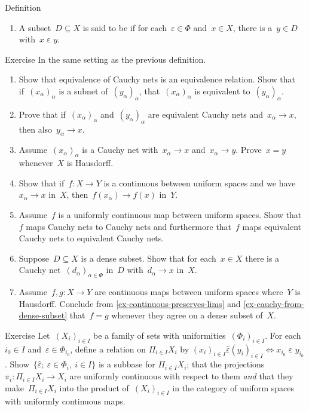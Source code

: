 \documentclass[b]{subfiles}
\begin{document}
\begin{parsec}
\begin{point}{Definition}
\begin{enumerate}
\item
A subset~$D \subseteq X$ is said to be 
    if for each~$\varepsilon \in \Phi$ and~$x \in X$,
    there is a~$y \in D$
    with~$x \mathrel\varepsilon y$.
\end{enumerate}
\end{point}
\begin{point}{Exercise}%
    In the same setting as the previous definition.
    \begin{enumerate}
\item
    Show that equivalence of Cauchy nets is an equivalence relation.
    Show that if~$(x_\alpha)_\alpha$ is a subnet of~$(y_\alpha)_\alpha$,
        that~$(x_\alpha)_\alpha$ is equivalent to~$(y_\alpha)_\alpha$.
\item
    Prove that if~$(x_\alpha)_\alpha$ and~$(y_\alpha)_\alpha$
        are equivalent Cauchy nets and~$x_\alpha \to x$,
        then also~$y_\alpha \to x$.
\item
    Assume~$(x_\alpha)_\alpha$ is a Cauchy net with~$x_\alpha \to x$
        and~$x_\alpha \to y$.  Prove~$x = y$ whenever~$X$ is Hausdorff.
\item\label{ex-continuous-preserves-lims}
    Show that if~$f\colon X \to Y$ is a continuous
    between uniform spaces
        and we have~$x_\alpha \to x$ in~$X$,
        then~$f(x_\alpha) \to f(x)$ in~$Y$.
\item
    Assume~$f$ is a uniformly continuous map between uniform spaces.
    Show that $f$ maps Cauchy nets to Cauchy nets
    and furthermore that~$f$ maps equivalent Cauchy nets to equivalent
        Cauchy nets.
\item\label{ex-cauchy-from-dense-subset}
    Suppose~$D \subseteq X$ is a dense subset.
    Show that for each~$x \in X$
    there is a Cauchy net~$(d_\alpha)_{\alpha \in \Phi}$
    in~$D$ with~$d_\alpha \to x$ in~$X$.
\item
    Assume~$f,g\colon X \to Y$ are continuous maps between uniform spaces
        where~$Y$ is Hausdorff.
Conclude from \ref{ex-continuous-preserves-lims} and
    \ref{ex-cauchy-from-dense-subset}
    that~$f=g$ whenever they agree on a dense subset of~$X$.
    \end{enumerate}
\end{point}
\begin{point}{Exercise}%
    Let~$(X_i)_{i \in I}$ be a family of sets with
        uniformities~$(\Phi_i)_{i \in I}$.
    For each~$i_0 \in I$
    and~$\varepsilon \in \Phi_{i_0}$,
    define a relation on
    $\Pi_{i \in I} X_i$ by
    $(x_i)_{i \in I} \mathrel{\hat\varepsilon} (y_i)_{i \in I}
    \iff x_{i_0} \mathrel\varepsilon y_{i_0}$.
    Show~$\{ \hat\varepsilon;\ \varepsilon \in \Phi_i, \ i\in I \}$
    is a subbase for $\Pi_{i \in I} X_i$;
    that the projections~$\pi_i \colon \Pi_{i \in I} X_i \to X_i$
    are uniformly continuous with respect to them
    \emph{and} that they make~$\Pi_{i \in I} X_i$
    into the product of~$(X_i)_{i \in I}$
    in the category of uniform spaces with uniformly continuous maps.
\end{point}
\end{parsec}
\end{document}
